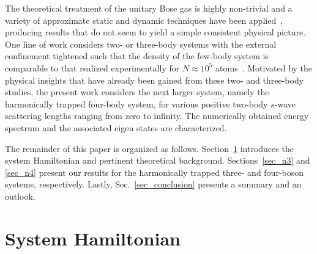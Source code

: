 \documentclass[aps,pra,twocolumn,showpacs,superscriptaddress]{revtex4}
\begin{document}
The theoretical treatment of the unitary Bose gas is highly
non-trivial and a variety of approximate
static and dynamic techniques
have been
applied~\cite{song2009,lee2010,yin2013,zhou2013,sykes2014,corson2015,ancilotto2015,yin2016,jiang2016,ding2017,colussi2017},
producing results that do not seem
to yield
a simple consistent physical picture.
One line of work considers two- or three-body systems 
with the external confinement tightened such that the density
of the few-body system is comparable to that realized experimentally
for $N \approx 10^5$ atoms~\cite{klauss2017,sykes2014,colussi2017}.
Motivated by the physical insights that have already been gained from
these two- and three-body studies,
the present work considers the next larger system, namely
the harmonically trapped four-body system,
for various positive two-body $s$-wave scattering lengths
ranging from zero to infinity.
The numerically obtained energy spectrum and the associated 
eigen states are characterized.

The remainder of this paper is organized as follows.
Section~\ref{sec_background} introduces the
system Hamiltonian and pertinent theoretical background.
Sections~\ref{sec_n3} and \ref{sec_n4}
present our results for the harmonically trapped
three- and four-boson systems, respectively.
Lastly, Sec.~\ref{sec_conclusion}
presents a summary and an outlook.



\section{System Hamiltonian}
\label{sec_background}
\end{document}
